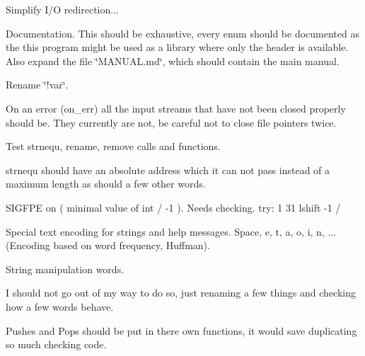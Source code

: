 \begin{DoxyItemize}
\item Simplify I/\-O redirection...
\end{DoxyItemize}


\begin{DoxyItemize}
\item Documentation. This should be exhaustive, every enum should be documented as the this program might be used as a library where only the header is available. Also expand the file \char`\"{}\-M\-A\-N\-U\-A\-L.\-md\char`\"{}, which should contain the main manual.
\end{DoxyItemize}

Rename \char`\"{}!var\char`\"{}.


\begin{DoxyItemize}
\item On an error (on\-\_\-err) all the input streams that have not been closed properly should be. They currently are not, be careful not to close file pointers twice.
\end{DoxyItemize}


\begin{DoxyItemize}
\item Test strnequ, rename, remove calls and functions.
\end{DoxyItemize}

strnequ should have an absolute address which it can not pass instead of a maximum length as should a few other words.


\begin{DoxyItemize}
\item S\-I\-G\-F\-P\-E on ( minimal value of int / -\/1 ). Needs checking. try\-: 1 31 lshift -\/1 /
\end{DoxyItemize}


\begin{DoxyItemize}
\item Special text encoding for strings and help messages. Space, e, t, a, o, i, n, ... (Encoding based on word frequency, Huffman).
\end{DoxyItemize}


\begin{DoxyItemize}
\item String manipulation words.
\end{DoxyItemize}

I should not go out of my way to do so, just renaming a few things and checking how a few words behave.


\begin{DoxyItemize}
\item Pushes and Pops should be put in there own functions, it would save duplicating so much checking code.
\end{DoxyItemize}


